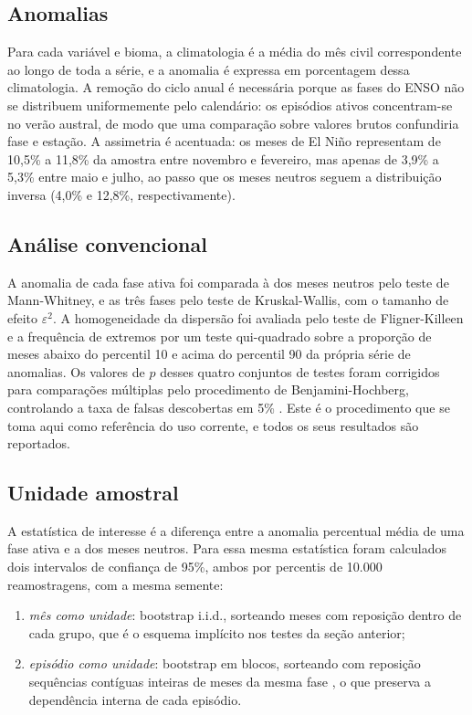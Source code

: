 \documentclass[a4paper,fleqn]{cas-sc}
\begin{document}
\subsection{Anomalias}

Para cada variável e bioma, a climatologia é a média do mês civil correspondente ao longo de toda a série, e a anomalia é expressa em porcentagem dessa climatologia. A remoção do ciclo anual é necessária porque as fases do ENSO não se distribuem uniformemente pelo calendário: os episódios ativos concentram-se no verão austral, de modo que uma comparação sobre valores brutos confundiria fase e estação. A assimetria é acentuada: os meses de El Niño representam de 10,5\% a 11,8\% da amostra entre novembro e fevereiro, mas apenas de 3,9\% a 5,3\% entre maio e julho, ao passo que os meses neutros seguem a distribuição inversa (4,0\% e 12,8\%, respectivamente).

\subsection{Análise convencional}

A anomalia de cada fase ativa foi comparada à dos meses neutros pelo teste de Mann-Whitney, e as três fases pelo teste de Kruskal-Wallis, com o tamanho de efeito $\varepsilon^2$. A homogeneidade da dispersão foi avaliada pelo teste de Fligner-Killeen e a frequência de extremos por um teste qui-quadrado sobre a proporção de meses abaixo do percentil 10 e acima do percentil 90 da própria série de anomalias. Os valores de $p$ desses quatro conjuntos de testes foram corrigidos para comparações múltiplas pelo procedimento de Benjamini-Hochberg, controlando a taxa de falsas descobertas em 5\% \citep{benjamini1995}. Este é o procedimento que se toma aqui como referência do uso corrente, e todos os seus resultados são reportados.

\subsection{Unidade amostral}

A estatística de interesse é a diferença entre a anomalia percentual média de uma fase ativa e a dos meses neutros. Para essa mesma estatística foram calculados dois intervalos de confiança de 95\%, ambos por percentis de 10.000 reamostragens, com a mesma semente:

\begin{enumerate}
  \item \emph{mês como unidade}: bootstrap i.i.d., sorteando meses com reposição dentro de cada grupo, que é o esquema implícito nos testes da seção anterior;
  \item \emph{episódio como unidade}: bootstrap em blocos, sorteando com reposição sequências contíguas inteiras de meses da mesma fase \citep{kunsch1989, politis1994}, o que preserva a dependência interna de cada episódio.
\end{enumerate}
\end{document}
